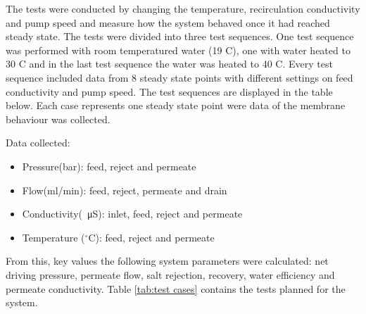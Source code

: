 The tests were conducted by changing the temperature, recirculation conductivity and pump speed and measure how the system behaved once it had reached steady state. The tests were divided into three test sequences. One test sequence was performed with room temperatured water (19 C), one with water heated to 30 C and in the last test sequence the water was heated to 40 C. Every test sequence included data from 8 steady state points with different settings on feed conductivity and pump speed. The test sequences are displayed in the table below. Each case represents one steady state point were data of the membrane behaviour was collected. 

Data collected:

\begin{itemize}
\item Pressure(bar): feed, reject and permeate
\item Flow(ml/min): feed, reject, permeate and drain
\item Conductivity(\SI{}{\micro\siemens}): inlet, feed, reject and permeate
\item Temperature ($^\circ$C): feed, reject and permeate
\end{itemize}

From this, key values the following system parameters were calculated: net driving pressure, permeate flow, salt rejection, recovery, water efficiency and permeate conductivity. Table  \ref{tab:test cases} contains the tests planned for the system.

\newpage

